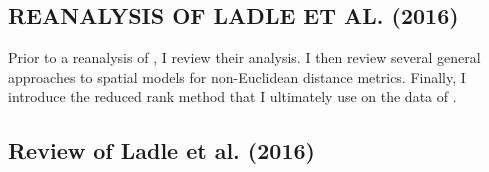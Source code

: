\documentclass[11pt, titlepage]{article}\usepackage[]{graphicx}\usepackage[]{color}
\begin{document}
\begin{spacing}{1.9}
\begin{flushleft}










\section*{REANALYSIS OF LADLE ET AL. (2016)}

Prior to a reanalysis of \citet{Ladl:Avga:Whea:Boyc:pred:2016}, I review their analysis.  I then review several general approaches to spatial models for non-Euclidean distance metrics. Finally, I introduce the reduced rank method that I ultimately use on the data of \citet{Ladl:Avga:Whea:Boyc:pred:2016}.

\subsection*{Review of Ladle et al. (2016)}


\end{flushleft}
\end{spacing}
\end{document}
